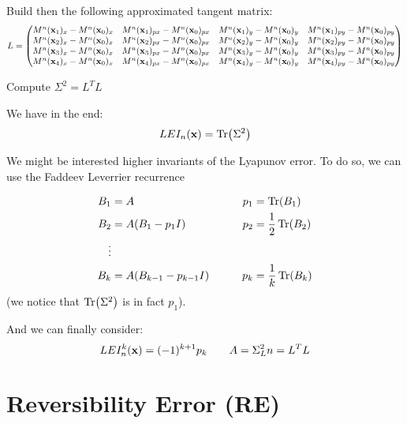 \documentclass[10pt,a4paper]{article}
\begin{document}
Build then the following approximated tangent matrix:
\begin{equation}
    L = \begin{pmatrix}
        M^n(\vb{x}_1)_x - M^n(\vb{x}_0)_x & M^n(\vb{x}_1)_{px} - M^n(\vb{x}_0)_{px} &
        M^n(\vb{x}_1)_y - M^n(\vb{x}_0)_y & M^n(\vb{x}_1)_{py} - M^n(\vb{x}_0)_{py} \\
        M^n(\vb{x}_2)_x - M^n(\vb{x}_0)_x & M^n(\vb{x}_2)_{px} - M^n(\vb{x}_0)_{px} &
        M^n(\vb{x}_2)_y - M^n(\vb{x}_0)_y & M^n(\vb{x}_2)_{py} - M^n(\vb{x}_0)_{py} \\
        M^n(\vb{x}_3)_x - M^n(\vb{x}_0)_x & M^n(\vb{x}_3)_{px} - M^n(\vb{x}_0)_{px} &
        M^n(\vb{x}_3)_y - M^n(\vb{x}_0)_y & M^n(\vb{x}_3)_{py} - M^n(\vb{x}_0)_{py} \\
        M^n(\vb{x}_4)_x - M^n(\vb{x}_0)_x & M^n(\vb{x}_4)_{px} - M^n(\vb{x}_0)_{px} &
        M^n(\vb{x}_4)_y - M^n(\vb{x}_0)_y & M^n(\vb{x}_4)_{py} - M^n(\vb{x}_0)_{py} \\ 
    \end{pmatrix}
\end{equation}

Compute $\Sigma^2 = L^TL$

We have in the end:
\begin{equation}
    LEI_n(\vb{x}) = \Tr(\Sigma^2)
\end{equation}

We might be interested higher invariants of the Lyapunov error. To do so, we can use the Faddeev Leverrier recurrence

\begin{align}
    B_1 &= A \qquad &p_1 &= \Tr(B_1) \\
    B_2 &= A(B_1 - p_1 I) \qquad &p_2 &= \frac{1}{2} \Tr(B_2) \\
    \vdots\\
    B_k &= A(B_{k-1} - p_{k-1} I) \qquad &p_k &= \frac{1}{k} \Tr(B_k) \\
\end{align}
(we notice that $\Tr(\Sigma^2)$ is in fact $p_1$).

And we can finally consider:
\begin{equation}
    LEI^k_n(\vb{x}) = (-1)^{k+1} p_k \qquad A=\Sigma^2_Ln = L^TL
\end{equation}

\section{Reversibility Error (RE)}
\end{document}
